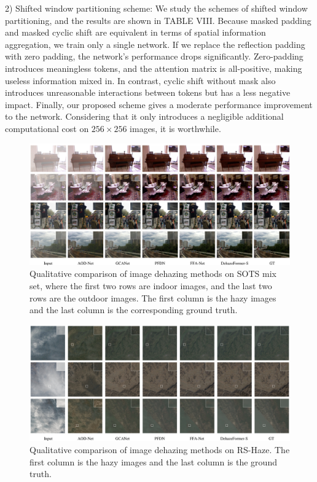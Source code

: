 2) Shifted window partitioning scheme: We study the schemes of shifted window partitioning, and the results are shown in TABLE VIII. Because masked padding and masked cyclic shift are equivalent in terms of spatial information aggregation, we train only a single network. If we replace the reflection padding with zero padding, the network’s performance drops significantly. Zero-padding introduces meaningless tokens, and the attention matrix is all-positive, making useless information mixed in. In contrast, cyclic shift without mask also introduces unreasonable interactions between tokens but has a less negative impact. Finally, our proposed scheme gives a moderate performance improvement to the network. Considering that it only introduces a negligible additional computational cost on $256\times256$ images, it is worthwhile.

\begin{figure}[htbp]
\centering
\includegraphics[width=0.8\linewidth]{images/04fb62576c074c53b0259f0492bff5131285846e221578c66c5a2c0108fedaa9.jpg}
\caption{Qualitative comparison of image dehazing methods on SOTS mix set, where the first two rows are indoor images, and the last two rows are the outdoor images. The first column is the hazy images and the last column is the corresponding ground truth.}
\label{fig:7}
\end{figure}


\begin{figure}[htbp]
\centering
\includegraphics[width=0.8\linewidth]{images/ee089cc0bf5c7faedd7d7525a95a921265c2c825cdf44f5ae28cfcdbeabb85e6.jpg}
\caption{Qualitative comparison of image dehazing methods on RS-Haze. The first column is the hazy images and the last column is the ground truth.}
\label{fig:8}
\end{figure}


